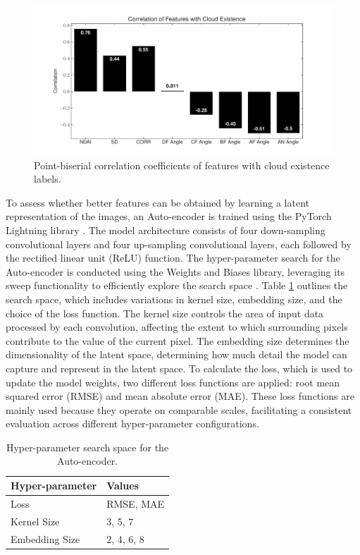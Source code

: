 \documentclass[11pt,letterpaper]{article}
\begin{document}
\begin{figure}[H]
    \centering
    \includegraphics[width=\linewidth]{figs/correlation_features.pdf}
    \caption{Point-biserial correlation coefficients of features with cloud existence labels.}
    \label{fig_correlation_features}
\end{figure}

To assess whether better features can be obtained by learning a latent representation of the images, an Auto-encoder is trained using the PyTorch Lightning library \parencite[]{pytorch_lightning}. The model architecture consists of four down-sampling convolutional layers and four up-sampling convolutional layers, each followed by the rectified linear unit (ReLU) function. The hyper-parameter search for the Auto-encoder is conducted using the Weights and Biases library, leveraging its sweep functionality to efficiently explore the search space \parencite[]{wandb}. Table \ref{table:Auto-encoder_hp_space} outlines the search space, which includes variations in kernel size, embedding size, and the choice of the loss function. The kernel size controls the area of input data processed by each convolution, affecting the extent to which surrounding pixels contribute to the value of the current pixel. The embedding size determines the dimensionality of the latent space, determining how much detail the model can capture and represent in the latent space. To calculate the loss, which is used to update the model weights, two different loss functions are applied: root mean squared error (RMSE) and mean absolute error (MAE). These loss functions are mainly used because they operate on comparable scales, facilitating a consistent evaluation across different hyper-parameter configurations.
\begin{table}[]
\centering
\begin{tabular}{|l|l|}
\hline
\textbf{Hyper-parameter} & \textbf{Values} \\ \hline
Loss                    & RMSE, MAE       \\
Kernel Size             & 3, 5, 7         \\
Embedding Size          & 2, 4, 6, 8      \\ \hline
\end{tabular}
\caption{Hyper-parameter search space for the Auto-encoder.}
\label{table:Auto-encoder_hp_space}
\end{table}
\end{document}
